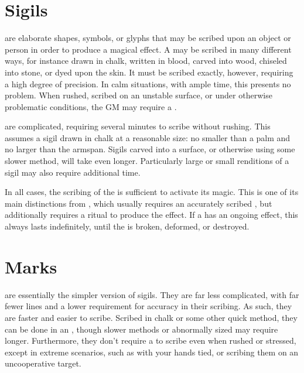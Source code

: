 
\section{Sigils}

\capital{\sigils} are elaborate shapes, symbols, or glyphs that may be scribed upon an object or person in order to produce a magical effect.
A {\sigil} may be scribed in many different ways, for instance drawn in chalk, written in blood, carved into wood, chiseled into stone, or dyed upon the skin.
It must be scribed exactly, however, requiring a high degree of precision.
In calm situations, with ample time, this presents no problem.
When rushed, scribed on an unstable surface, or under otherwise problematic conditions, the GM may require a  {\test}.

\capital{\sigils} are complicated, requiring several minutes to scribe without rushing.
This assumes a sigil drawn in chalk at a reasonable size: no smaller than a palm and no larger than the  armspan.
Sigils carved into a surface, or otherwise using some slower method, will take even longer.
Particularly large or small renditions of a sigil may also require additional time.

In all cases, the scribing of the {\sigil} is sufficient to activate its magic.
This is one of its main distinctions from , which usually requires an accurately scribed , but additionally requires a ritual to produce the effect.
If a {\sigil} has an ongoing effect, this always lasts indefinitely, until the {\sigil} is broken, deformed, or destroyed.

\section{Marks}

\capital{\sigilmarks} are essentially the simpler version of sigils.
They are far less complicated, with far fewer lines and a lower requirement for accuracy in their scribing.
As such, they are faster and easier to scribe.
Scribed in chalk or some other quick method, they can be done in an {\action}, though slower methods or abnormally sized {\sigilmarks} may require longer.
Furthermore, they don't require a {\test} to scribe even when rushed or stressed, except in extreme scenarios, such as with your hands tied, or scribing them on an uncooperative target.

